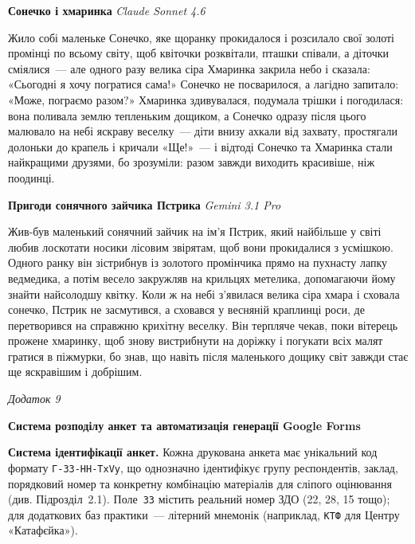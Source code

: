 \documentclass[14pt, a4paper]{extreport}
\begin{document}
\vspace{14pt}
\textbf{Сонечко і хмаринка} \hfill\textit{Claude Sonnet 4.6}

\medskip
Жило собі маленьке Сонечко, яке щоранку прокидалося і розсилало свої золоті промінці по всьому світу, щоб квіточки розквітали, пташки співали, а діточки сміялися~--- але одного разу велика сіра Хмаринка закрила небо і сказала: «Сьогодні я хочу погратися сама!» Сонечко не посварилося, а лагідно запитало: «Може, пограємо разом?» Хмаринка здивувалася, подумала трішки і погодилася: вона поливала землю тепленьким дощиком, а Сонечко одразу після цього малювало на небі яскраву веселку~--- діти внизу ахкали від захвату, простягали долоньки до крапель і кричали «Ще!»~--- і відтоді Сонечко та Хмаринка стали найкращими друзями, бо зрозуміли: разом завжди виходить красивіше, ніж поодинці.

\vspace{14pt}
\textbf{Пригоди сонячного зайчика Пстрика} \hfill\textit{Gemini 3.1 Pro}

\medskip
Жив-був маленький сонячний зайчик на ім'я Пстрик, який найбільше у світі любив лоскотати носики лісовим звірятам, щоб вони прокидалися з усмішкою. Одного ранку він зістрибнув із золотого промінчика прямо на пухнасту лапку ведмедика, а потім весело закружляв на крильцях метелика, допомагаючи йому знайти найсолодшу квітку. Коли ж на небі з'явилася велика сіра хмара і сховала сонечко, Пстрик не засмутився, а сховався у весняній краплинці роси, де перетворився на справжню крихітну веселку. Він терпляче чекав, поки вітерець прожене хмаринку, щоб знову вистрибнути на доріжку і погукати всіх малят гратися в піжмурки, бо знав, що навіть після маленького дощику світ завжди стає ще яскравішим і добрішим.

\newpage
\begin{flushright}\textit{Додаток 9}\end{flushright}
\begin{center}\textbf{Система розподілу анкет та автоматизація генерації Google Forms}\end{center}
\vspace{0.3cm}

\textbf{Система ідентифікації анкет.}
Кожна друкована анкета має унікальний код формату \texttt{Г-ЗЗ-НН-TxVy}, що однозначно ідентифікує групу респондентів, заклад, порядковий номер та конкретну комбінацію матеріалів для сліпого оцінювання (див. Підрозділ~2.1). Поле~\texttt{ЗЗ} містить реальний номер ЗДО (22, 28, 15 тощо); для додаткових баз практики~--- літерний мнемонік (наприклад, \texttt{КТФ} для Центру «Катафєйка»).
\end{document}
